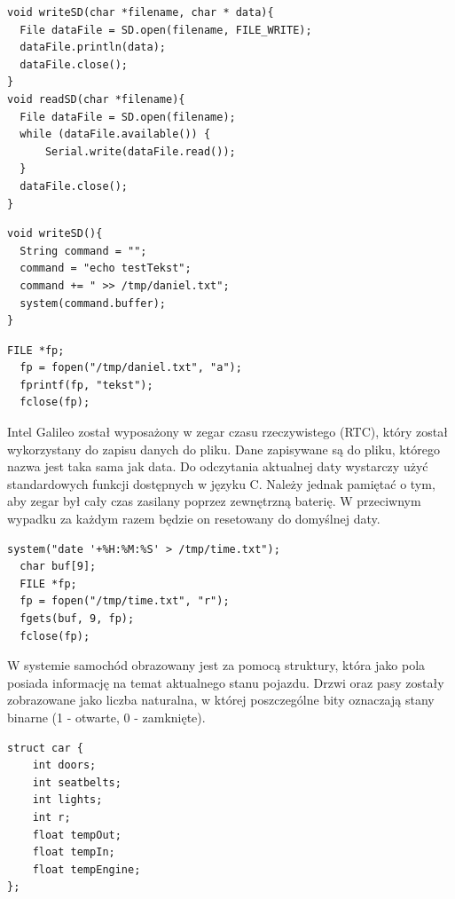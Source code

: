\documentclass{xmgr}
\begin{document}
\begin{lstlisting}[label=bot-dirs-alg,caption=Obsługa karty microSD za pomocą mechanizmu Arduino]
void writeSD(char *filename, char * data){
  File dataFile = SD.open(filename, FILE_WRITE);
  dataFile.println(data);
  dataFile.close();
}
void readSD(char *filename){
  File dataFile = SD.open(filename);
  while (dataFile.available()) {
      Serial.write(dataFile.read());
  }
  dataFile.close();
}
\end{lstlisting}

\begin{lstlisting}[label=bot-dirs-alg,caption=Obsługa karty microSD za pomocą mechanizmu systemu operacyjnego]
void writeSD(){
  String command = "";  
  command = "echo testTekst";
  command += " >> /tmp/daniel.txt";
  system(command.buffer);
}
\end{lstlisting}

\begin{lstlisting}[label=bot-dirs-alg,caption=Obsługa karty microSD za pomocą języka C]
  FILE *fp;
  fp = fopen("/tmp/daniel.txt", "a");
  fprintf(fp, "tekst");
  fclose(fp);
\end{lstlisting}

Intel Galileo został wyposażony w zegar czasu rzeczywistego (RTC), który został wykorzystany do zapisu danych do pliku. Dane zapisywane są do pliku, którego nazwa jest taka sama jak data. Do odczytania aktualnej daty wystarczy użyć standardowych funkcji dostępnych w języku C. Należy jednak pamiętać o tym, aby zegar był cały czas zasilany poprzez zewnętrzną baterię. W przeciwnym wypadku za każdym razem będzie on resetowany do domyślnej daty.

\begin{lstlisting}[label=bot-dirs-alg,caption=Odczyt aktualnej daty]
  system("date '+%H:%M:%S' > /tmp/time.txt");
  char buf[9];
  FILE *fp;
  fp = fopen("/tmp/time.txt", "r");
  fgets(buf, 9, fp);
  fclose(fp);
\end{lstlisting}

W systemie samochód obrazowany jest za pomocą struktury, która jako pola posiada informację na temat aktualnego stanu pojazdu. Drzwi oraz pasy zostały zobrazowane jako liczba naturalna, w której poszczególne bity oznaczają stany binarne (1 - otwarte, 0 - zamknięte).

\begin{lstlisting}[label=bot-dirs-alg,caption=Struktura samochodu w programie]
struct car {
	int doors;
 	int seatbelts;
 	int lights;         
 	int r;
 	float tempOut;
 	float tempIn;
 	float tempEngine;
};
\end{lstlisting}
\end{document}
